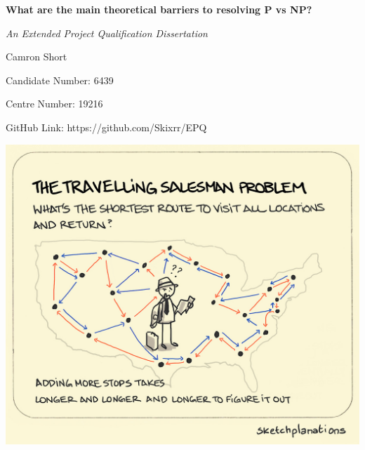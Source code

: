 \documentclass[12pt]{report}
\begin{document}
\begin{titlepage}
    \centering
    \vspace*{1cm}
    {\Huge\bfseries What are the main theoretical barriers to resolving P vs NP?\par}
    \vspace{1cm}
    {\Large\itshape An Extended Project Qualification Dissertation\/\par}
    \vspace{1cm}
    {\Large Camron Short\par}
    {\large Candidate Number: 6439\par}
    {\large Centre Number: 19216\par}
    {\small GitHub Link: https://github.com/Skixrr/EPQ\par}
    \vspace{0.7cm}
    \includegraphics[width=1\textwidth]{CoverPhoto.jpg}
    \thispagestyle{empty}
\end{titlepage}
\end{document}

